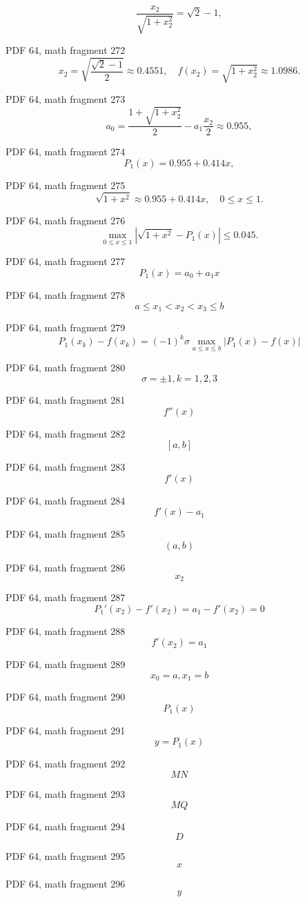 \documentclass[UTF8,fontset=fandol]{ctexart}
\begin{document}
\[
\frac{x_2}{\sqrt{1+x_2^2}} = \sqrt{2} - 1,
\]
\par
PDF 64, math fragment 272
\[
x_2 = \sqrt{\frac{\sqrt{2}-1}{2}} \approx 0.4551, \quad f(x_2) = \sqrt{1+x_2^2} \approx 1.0986.
\]
\par
PDF 64, math fragment 273
\[
a_0 = \frac{1 + \sqrt{1+x_2^2}}{2} - a_1 \frac{x_2}{2} \approx 0.955,
\]
\par
PDF 64, math fragment 274
\[
P_1(x) = 0.955 + 0.414x,
\]
\par
PDF 64, math fragment 275
\[
\sqrt{1+x^2} \approx 0.955 + 0.414x, \quad 0 \leqslant x \leqslant 1. \tag{3.2.9}
\]
\par
PDF 64, math fragment 276
\[
\max_{0 \leqslant x \leqslant 1} |\sqrt{1+x^2} - P_1(x)| \leqslant 0.045.
\]
\par
PDF 64, math fragment 277
\[P_1(x) = a_0 + a_1x\]
\par
PDF 64, math fragment 278
\[a \leqslant x_1 < x_2 < x_3 \leqslant b\]
\par
PDF 64, math fragment 279
\[P_1(x_k) - f(x_k) = (-1)^k \sigma \max_{a \leqslant x \leqslant b} |P_1(x) - f(x)|\]
\par
PDF 64, math fragment 280
\[\sigma = \pm 1, k = 1, 2, 3\]
\par
PDF 64, math fragment 281
\[f''(x)\]
\par
PDF 64, math fragment 282
\[[a, b]\]
\par
PDF 64, math fragment 283
\[f'(x)\]
\par
PDF 64, math fragment 284
\[f'(x) - a_1\]
\par
PDF 64, math fragment 285
\[(a, b)\]
\par
PDF 64, math fragment 286
\[x_2\]
\par
PDF 64, math fragment 287
\[P_1'(x_2) - f'(x_2) = a_1 - f'(x_2) = 0\]
\par
PDF 64, math fragment 288
\[f'(x_2) = a_1\]
\par
PDF 64, math fragment 289
\[x_0 = a, x_1 = b\]
\par
PDF 64, math fragment 290
\[P_1(x)\]
\par
PDF 64, math fragment 291
\[y = P_1(x)\]
\par
PDF 64, math fragment 292
\[MN\]
\par
PDF 64, math fragment 293
\[MQ\]
\par
PDF 64, math fragment 294
\[D\]
\par
PDF 64, math fragment 295
\[x\]
\par
PDF 64, math fragment 296
\[y\]
\par
\end{document}

